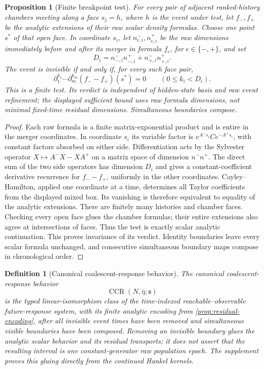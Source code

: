 \documentclass[11pt]{article}
\newtheorem{proposition}[theorem]{Proposition}
\newtheorem{definition}[theorem]{Definition}
\newcommand{\CCR}{\operatorname{CCR}}
\begin{document}
\begin{proposition}[Finite breakpoint test]
\label{prop:breakpoint}
For every pair of adjacent ranked-history chambers meeting along a face $s_j=h$, where $h$ is the event under test, let $f_-,f_+$ be the analytic extensions of their raw scalar density formulas.  Choose one point $s^*$ of that open face.  In coordinate $s_i$, let $n_{\epsilon,i}^-,n_{\epsilon,i}^+$ be the raw dimensions immediately before and after its merger in formula $f_\epsilon$, for $\epsilon\in\{-,+\}$, and set
\[
D_i=n_{-,i}^-n_{-,i}^++n_{+,i}^-n_{+,i}^+.
\]
The event is invisible if and only if, for every such face pair,
\[
\partial_1^{k_1}\cdots\partial_m^{k_m}(f_--f_+)(s^*)=0
\qquad(0\le k_i<D_i).
\]
This is a finite test.  Its verdict is independent of hidden-state basis and raw event refinement; the displayed sufficient bound uses raw formula dimensions, not minimal fixed-time residual dimensions.  Simultaneous boundaries compose.
\end{proposition}

\begin{proof}
Each raw formula is a finite matrix-exponential product and is entire in the merger coordinates.  In coordinate $s_i$ its variable factor is $e^{A^-s_i}Ce^{-A^+s_i}$, with constant factors absorbed on either side.  Differentiation acts by the Sylvester operator $X\mapsto A^-X-XA^+$ on a matrix space of dimension $n^-n^+$.  The direct sum of the two side operators has dimension $D_i$ and gives a constant-coefficient derivative recurrence for $f_--f_+$, uniformly in the other coordinates.  Cayley--Hamilton, applied one coordinate at a time, determines all Taylor coefficients from the displayed mixed box.  Its vanishing is therefore equivalent to equality of the analytic extensions.  There are finitely many histories and chamber faces.  Checking every open face glues the chamber formulas; their entire extensions also agree at intersections of faces.  Thus the test is exactly scalar analytic continuation.  This proves invariance of its verdict.  Identity boundaries leave every scalar formula unchanged, and consecutive simultaneous boundary maps compose in chronological order.
\end{proof}

\begin{definition}[Canonical coalescent-response behavior]
\label{def:ccr}
The \emph{canonical coalescent-response behavior}
\[
\CCR(N,\bar\eta;\mathfrak s)
\]
is the typed linear-isomorphism class of the time-indexed reachable--observable future-response system, with its finite analytic encoding from \cref{prop:residual-encoding}, after all invisible event times have been removed and simultaneous visible boundaries have been composed.  Removing an invisible boundary glues the analytic scalar behavior and its residual transports; it does not assert that the resulting interval is one constant-generator raw population epoch.  The supplement proves this gluing directly from the continued Hankel kernels.
\end{definition}
\end{document}
